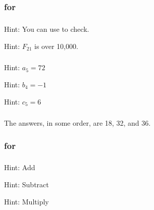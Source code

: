 \subsection{\answers}

\subsubsection{\answers for  \subfib}

\subsubsection*{ \answers}
\begin{apart}
    \item Hint: You can use  to check.
    \item Hint: $F_{21}$ is over 10,000.
\end{apart}

\subsubsection*{ \answers}
\begin{apart}
    \item Hint: $a_5=72$
    \item Hint: $b_4=-1$
    \item Hint: $c_5=6$
\end{apart}

\subsubsection*{ \answers}
The answers, in some order, are 18, 32, and 36.

\subsubsection{\answers for  \submodelhigher}

\subsubsection*{ \answers}
\begin{apart}
    \item Hint: Add
    \item Hint: Subtract
    \item Hint: Multiply
\end{apart}

